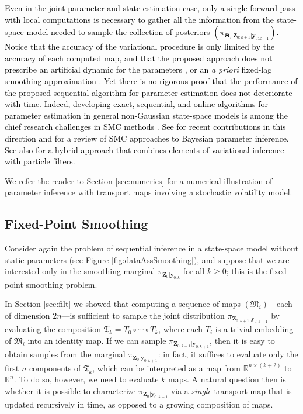 \documentclass[twoside,11pt]{article}
\newcommand{\re}{\mathbb{R}}
\newcommand{\yb}{\boldsymbol{y}}
\newcommand{\Zb}{\boldsymbol{Z}}
\newcommand{\vhyp}{\boldsymbol{\Theta}}
\newcommand{\submap}{\mathfrak{M}}
\begin{document}
\textcolor{black}{ 
Even in the joint parameter and state estimation case, only a single
forward pass with local computations is necessary to 
%
gather
all the
information from
the state-space model needed to sample the collection of posteriors
$(\pi_{\vhyp,\,\Zb_{0:k+1} \vert \yb_{0:k+1} })$.
Notice that the accuracy of the variational procedure is only limited by the
accuracy of each computed map, and that the proposed approach does not prescribe
an
artificial dynamic for the  parameters
\citep{kitagawa1998self,liu2001combined}, or an \textit{a priori} fixed-lag
smoothing approximation \citep{polson2008practical}.
%
Yet there is no rigorous proof that the performance of the
proposed sequential algorithm for parameter estimation does not deteriorate with time.
Indeed, developing exact, sequential, and online algorithms for parameter estimation 
in general non-Gaussian state-space models is among the chief research challenges in  SMC methods \citep{jacob2015sequential}. 
See \citep{chopin2013smc2,crisan2013nested,del2017biased} for recent contributions in this direction 
and \citep{kantas2015particle}
for a review of SMC approaches to Bayesian parameter inference.
See also \citep{erol2017nearly} for a hybrid approach that combines elements of variational
inference with particle filters.
%
}

%
%
%
%
%
%
%
%
%
%
%
%
%
%
%
%
%
%
%
%
%
%
%
%
%
%
%
%

%
%
%
%
%
%
%
We refer the reader to Section \ref{sec:numerics} for 
a numerical illustration of parameter inference with transport maps involving a stochastic
volatility model. %
%

\subsection{Fixed-Point Smoothing}
\label{sec:margSmooth}
%
%
%
%
%
Consider again the problem of sequential inference in
a state-space model without static parameters (see Figure
\ref{fig:dataAssSmoothing}), and suppose that we are interested
only in the smoothing marginal $\pi_{\Zb_0 \vert \yb_{0:k}}$ for all
$k \ge 0$; this is the fixed-point smoothing problem.
%
%
%
%
%

In Section \ref{sec:filt} we showed that computing a sequence of maps
$(\submap_i)$---each of dimension $2n$---is sufficient to sample the
joint distribution $\pi_{\Zb_{0:k+1} \vert \yb_{0:k+1}}$ by evaluating
the composition $\mathfrak{T}_k=T_0 \circ \cdots \circ T_k$, where
each $T_i$ is a trivial embedding of $\submap_i$ into an identity map.
If we can sample $\pi_{\Zb_{0:k+1} \vert \yb_{0:k+1}}$, then it is
easy to obtain samples from the marginal
$\pi_{\Zb_{0} \vert \yb_{0:k+1}}$: in fact, it suffices to evaluate
only the first $n$ components of $\mathfrak{T}_k$, which can be
interpreted as a map from $\re^{n\times (k+2)}$ to $\re^n$. To do so,
however, we need to evaluate $k$ maps.
%
%
%
A natural question then is whether it is possible to 
characterize $\pi_{\Zb_{0} \vert \yb_{0:k+1}}$
via a {\it single} transport map that is updated recursively 
%
in time, as opposed to a growing
composition of maps.
\end{document}
